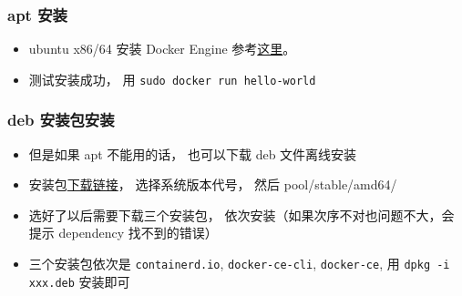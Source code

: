 
\begin{issues}
\issueDraft
\end{issues}

\subsubsection{apt 安装}
\begin{itemize}
\item ubuntu x86/64 安装 Docker Engine 参考\href{https://docs.docker.com/install/linux/docker-ce/ubuntu/}{这里}。
\item 测试安装成功， 用 \verb`sudo docker run hello-world`
\end{itemize}

\subsubsection{deb 安装包安装}
\begin{itemize}
\item 但是如果 apt 不能用的话， 也可以下载 deb 文件离线安装
\item 安装包\href{https://download.docker.com/linux/ubuntu/dists/}{下载链接}， 选择系统版本代号， 然后 pool/stable/amd64/
\item 选好了以后需要下载三个安装包， 依次安装（如果次序不对也问题不大，会提示 dependency 找不到的错误）
\item 三个安装包依次是 \verb|containerd.io|, \verb|docker-ce-cli|, \verb|docker-ce|, 用 \verb`dpkg -i xxx.deb` 安装即可
\end{itemize}


